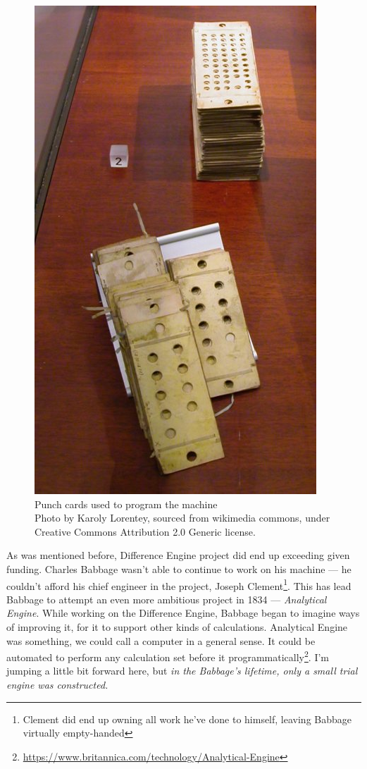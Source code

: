 \documentclass[../../what-is-computer]{subfiles}
\begin{document}
    \begin{figure}
        \centering
        \includegraphics[scale=0.8]{images/misc/analytical_engine_punch_cards.jpg}
        \caption{Punch cards used to program the machine\\\tiny{Photo by Karoly Lorentey, sourced from wikimedia commons, under  Creative Commons Attribution 2.0 Generic license.}}
    \end{figure}

    As was mentioned before, Difference Engine project did end up exceeding given funding. Charles Babbage wasn't able to continue to work on his machine --- he couldn't
    afford his chief engineer in the project, Joseph Clement\footnote{Clement did end up owning all work he've done to himself, leaving Babbage virtually empty-handed}.
    This has lead Babbage to attempt an even more ambitious project in 1834 --- \emph{Analytical Engine}. While working on the Difference Engine, Babbage began to imagine
    ways of improving it, for it to support other kinds of calculations. Analytical Engine was something, we could call a computer in a general sense. It could be
    automated to perform any calculation set before it programmatically\footnote{\href{https://www.britannica.com/technology/Analytical-Engine}
    {https://www.britannica.com/technology/Analytical-Engine}}. I'm jumping a little bit forward here, but \emph{in the Babbage's lifetime, only a small trial 
    engine was constructed.}  \par
\end{document}
